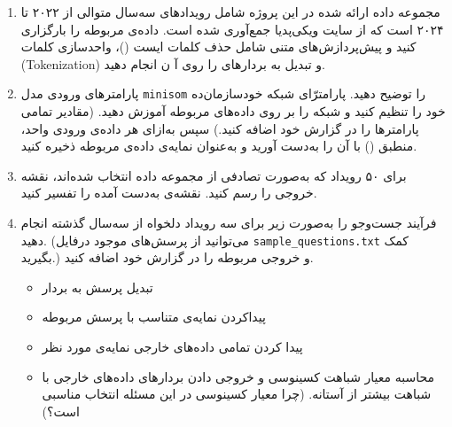 \begin{enumerate}
	
	
	
	
	
	\begin{latin}
		\begin{thebibliography}{9}
			Data Mining: Practical Machine Learning Tools and Techniques, 2016.
			
			Zeng GL. A deep-network piecewise linear approximation formula. IEEE Access. 2021 Aug 31;9:120665-74.
		\end{thebibliography} 
	\end{latin}
	
	
	
	
	\item مجموعه داده ارائه شده در این پروژه شامل رویداد‌های سه‌سال متوالی از ۲۰۲۲ تا ۲۰۲۴ است که از سایت ویکی‌پدیا جمع‌آوری شده است. داده‌ی مربوطه را بارگزاری کنید و پیش‌پردازش‌های متنی شامل حذف کلمات ایست ()، واحدسازی کلمات (‫‪Tokenization‬‬) و تبدیل به بردار‌های  را روی آ
	ن انجام دهید.
	
	
	
	
	
	\item پارامتر‌های ورودی مدل \texttt{minisom} را توضیح دهید. پارامتر‌ّای شبکه خودسازمان‌ده خود را تنظیم کنید و شبکه را بر روی داده‌های مربوطه آموزش دهید. (مقادیر تمامی پارامتر‌ها را در گزارش خود اضافه کنید.) سپس به‌ازای هر داده‌ی ورودی واحد، منطبق () با آن را به‌دست آورید و به‌عنوان نمایه‌ی داده‌ی مربوطه ذخیره کنید.
	
	
	
	
	
	\item برای ۵۰ رویداد که به‌صورت تصادفی از مجموعه داده انتخاب شده‌اند، نقشه خروجی را رسم کنید. نقشه‌ی به‌دست آمده را تفسیر کنید.
	
	
	
	\item فرآیند جست‌و‌جو را به‌صورت زیر برای سه رویداد دلخواه از سه‌سال گذشته انجام دهید. (می‌توانید از پرسش‌های موجود درفایل \texttt{sample\_questions.txt} کمک بگیرید.) و خروجی مربوطه را در گزارش خود اضافه کنید.
	
	\begin{itemize}
		\item تبدیل پرسش به بردار
		\item پیداکردن نمایه‌ی متناسب با پرسش مربوطه
		\item پیدا کردن تمامی داده‌های خارجی نمایه‌ی مورد نظر
		\item محاسبه معیار شباهت کسینوسی و خروجی دادن بردار‌های داده‌های خارجی با شباهت بیشتر از آستانه. (چرا معیار کسینوسی در این مسئله انتخاب مناسبی است؟)
	\end{itemize}
\end{enumerate}


